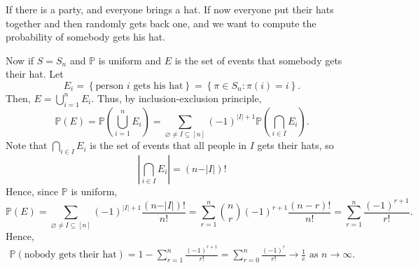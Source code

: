\begin{eg}
    If there is a party, and everyone brings a hat. If now everyone put their hats together and then randomly gets back one, and we want to compute the probability of somebody gets his hat. 
\end{eg}
\begin{explanation}
    Now if \(S = S_n\) and \(\mathbb{P} \) is uniform and \(E\) is the set of events that somebody gets their hat. Let 
    \[
        E_i = \left\{ \text{person } i \text{ gets his hat}   \right\} = \left\{ \pi \in S_n: \pi (i) = i \right\}.  
    \]
    Then, \(E = \bigcup_{i=1}^{n} E_i \). Thus, by inclusion-exclusion principle, 
    \[
        \mathbb{P} (E) = \mathbb{P} \left( \bigcup_{i=1}^{n} E_i  \right) = \sum_{\varnothing \neq I \subseteq [n]} (-1)^{\vert I \vert + 1} \mathbb{P} \left( \bigcap_{i \in I} E_i  \right).  
    \] 
    Note that \(\bigcap_{i \in I} E_i \) is the set of events that all people in \(I\) gets their hats, so 
    \[
        \left\vert \bigcap_{i \in I} E_i  \right\vert = (n - \vert I \vert )!
    \]  
    Hence, since \(\mathbb{P} \) is uniform, 
    \[
        \mathbb{P} (E) = \sum_{\varnothing \neq I \subseteq [n]}(-1)^{\vert I \vert + 1} \frac{(n - \vert I \vert )!}{n!} = \sum_{r=1}^n \binom{n}{r} (-1)^{r+1} \frac{(n-r)!}{n!} = \sum_{r=1}^n \frac{(-1)^{r+1}}{r!} .  
    \] 
    Hence,
    \begin{align*}
        \mathbb{P} \left( \text{nobody gets their hat}  \right) = 1 - \sum_{r=1}^n \frac{(-1)^{r+1}}{r!} = \sum_{r=0}^n \frac{(-1)^r}{r!} \to \frac{1}{e} \text{ as } n \to \infty .    
    \end{align*}
\end{explanation}